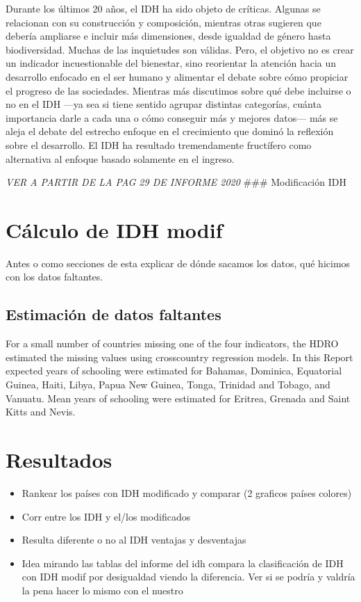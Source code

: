 \documentclass[
  10pt,
]{article}
\begin{document}
Durante los últimos 20 años, el IDH ha sido objeto de críticas. Algunas
se relacionan con su construcción y composición, mientras otras sugieren
que debería ampliarse e incluir más dimensiones, desde igualdad de
género hasta biodiversidad. Muchas de las inquietudes son válidas. Pero,
el objetivo no es crear un indicador incuestionable del bienestar, sino
reorientar la atención hacia un desarrollo enfocado en el ser humano y
alimentar el debate sobre cómo propiciar el progreso de las sociedades.
Mientras más discutimos sobre qué debe incluirse o no en el IDH ---ya
sea si tiene sentido agrupar distintas categorías, cuánta importancia
darle a cada una o cómo conseguir más y mejores datos--- más se aleja el
debate del estrecho enfoque en el crecimiento que dominó la reflexión
sobre el desarrollo. El IDH ha resultado tremendamente fructífero como
alternativa al enfoque basado solamente en el ingreso.

\emph{VER A PARTIR DE LA PAG 29 DE INFORME 2020} \#\#\# Modificación IDH

\hypertarget{cuxe1lculo-de-idh-modif}{%
\section{Cálculo de IDH modif}\label{cuxe1lculo-de-idh-modif}}

Antes o como secciones de esta explicar de dónde sacamos los datos, qué
hicimos con los datos faltantes.

\hypertarget{estimaciuxf3n-de-datos-faltantes}{%
\subsection{Estimación de datos
faltantes}\label{estimaciuxf3n-de-datos-faltantes}}

For a small number of countries missing one of the four indicators, the
HDRO estimated the missing values using crosscountry regression models.
In this Report expected years of schooling were estimated for Bahamas,
Dominica, Equatorial Guinea, Haiti, Libya, Papua New Guinea, Tonga,
Trinidad and Tobago, and Vanuatu. Mean years of schooling were estimated
for Eritrea, Grenada and Saint Kitts and Nevis.

\hypertarget{resultados}{%
\section{Resultados}\label{resultados}}

\begin{itemize}
\item
  Rankear los países con IDH modificado y comparar (2 graficos países
  colores)
\item
  Corr entre los IDH y el/los modificados
\item
  Resulta diferente o no al IDH ventajas y desventajas
\item
  Idea mirando las tablas del informe del idh compara la clasificación
  de IDH con IDH modif por desigualdad viendo la diferencia. Ver si se
  podría y valdría la pena hacer lo mismo con el nuestro
\end{itemize}
\end{document}
